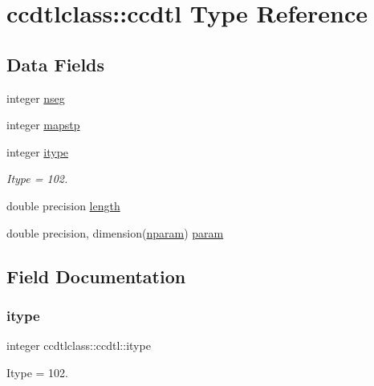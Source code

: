\hypertarget{structccdtlclass_1_1ccdtl}{}\section{ccdtlclass\+::ccdtl Type Reference}
\label{structccdtlclass_1_1ccdtl}
\subsection*{Data Fields}
\begin{DoxyCompactItemize}
\item 
integer \mbox{\hyperlink{structccdtlclass_1_1ccdtl_a56759205b010998a69c2716e35e0d6d6}{nseg}}
\item 
integer \mbox{\hyperlink{structccdtlclass_1_1ccdtl_a646c337f17e8c188638d58449ea92b99}{mapstp}}
\item 
integer \mbox{\hyperlink{structccdtlclass_1_1ccdtl_aea542f9975283b5fd43c8f15a0d2762f}{itype}}
\begin{DoxyCompactList}\small\item\em Itype = 102. \end{DoxyCompactList}\item 
double precision \mbox{\hyperlink{structccdtlclass_1_1ccdtl_a367acb3cd3326d78cf47fe5c8891b80c}{length}}
\item 
double precision, dimension(\mbox{\hyperlink{namespaceccdtlclass_a0e8e95c86f2dab6639fc79f05859b6ea}{nparam}}) \mbox{\hyperlink{structccdtlclass_1_1ccdtl_a6b125e6ca6440736ab2272ad373cc24d}{param}}
\end{DoxyCompactItemize}


\subsection{Field Documentation}
\mbox{\label{structccdtlclass_1_1ccdtl_aea542f9975283b5fd43c8f15a0d2762f}} 
\subsubsection{\texorpdfstring{itype}{itype}}
{\footnotesize\ttfamily integer ccdtlclass\+::ccdtl\+::itype}



Itype = 102. 

\mbox{\label{structccdtlclass_1_1ccdtl_a367acb3cd3326d78cf47fe5c8891b80c}} 
